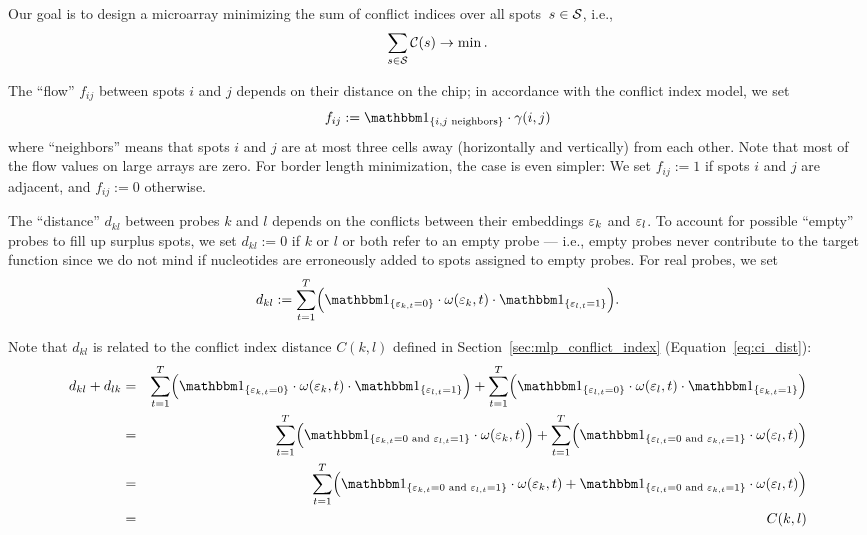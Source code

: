 Our goal is to design a microarray minimizing the sum of conflict indices over
all spots~$s \in {\mathcal{S}}$, i.e.,
\[
\sum_{s \in {\mathcal{S}}} \mathcal{C}(s) \to \min.
\]

The ``flow'' $f_{ij}$ between spots $i$ and $j$ depends on their distance on the
chip; in accordance with the conflict index model, we set
\begin{equation}
  f_{ij} := \Ind{i,j \text{ neighbors}} \cdot \gamma(i,j)
\end{equation}
where ``neighbors'' means that spots $i$ and $j$ are at most three cells away
(horizontally and vertically) from each other. Note that most of the flow values
on large arrays are zero. For border length minimization, the case is even
simpler: We set $f_{ij}:=1$ if spots $i$ and $j$ are adjacent, and $f_{ij}:=0$
otherwise.

The ``distance'' $d_{kl}$ between probes $k$ and $l$ depends on the conflicts
between their embeddings $\varepsilon_k$ and $\varepsilon_l$. To account for possible
``empty'' probes to fill up surplus spots, we set $d_{kl}:=0$ if $k$ or $l$ or
both refer to an empty probe --- i.e., empty probes never contribute to the
target function since we do not mind if nucleotides are erroneously added
to spots assigned to empty probes. For real probes, we set
\begin{equation}
  d_{kl} := \sum_{t=1}^{T} \Bigl(
    \Ind{\eps_{k,t}=0}
    \cdot \omega(\eps_k,t)
    \cdot \Ind{\eps_{l,t}=1} \Bigr).
\end{equation}

Note that $d_{kl}$ is related to the conflict index distance $C(k,l)$ defined in
Section~\ref{sec:mlp_conflict_index} (Equation~\ref{eq:ci_dist}):
\begin{eqnarray*}
d_{kl} + d_{lk} & = &
  \sum_{t=1}^{T} \Bigl( \Ind{\eps_{k,t}=0} \cdot \omega(\eps_k,t) \cdot \Ind{\eps_{l,t}=1} \Bigr)
  + \sum_{t=1}^{T} \Bigl( \Ind{\eps_{l,t}=0} \cdot \omega(\eps_l,t) \cdot \Ind{\eps_{k,t}=1} \Bigr) \\
& = &
  \sum_{t=1}^{T} \Bigl( \Ind{\eps_{k,t}=0 \text{ and } \eps_{l,t}=1} \cdot \omega(\eps_k,t) \Bigr)
  + \sum_{t=1}^{T} \Bigl( \Ind{\eps_{l,t}=0 \text{ and } \eps_{k,t}=1} \cdot \omega(\eps_l,t) \Bigr) \\
& = &
  \sum_{t=1}^{T} \Bigl(
                   \Ind{\eps_{k,t}=0 \text{ and } \eps_{l,t}=1} \cdot \omega(\eps_k,t) +
                   \Ind{\eps_{l,t}=0 \text{ and } \eps_{k,t}=1} \cdot \omega(\eps_l,t)
                  \Bigr) \\
 & = & C(k,l)
\end{eqnarray*}

